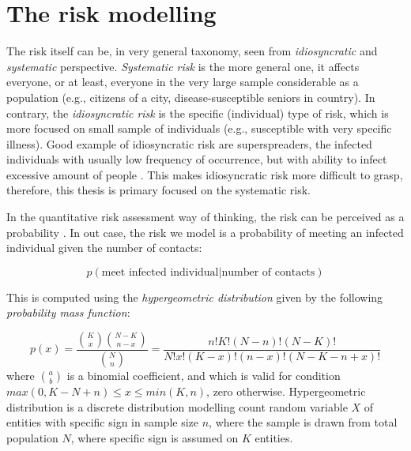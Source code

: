 \documentclass[
  digital, %
  table,   %
  twoside, %
  12pt,
  lof,     %
  lot,     %
]{fithesis3}
\begin{document}
\section{The risk modelling}

The risk itself can be, in very general taxonomy, seen from
\textit{idiosyncratic} and \textit{systematic} perspective.
\textit{Systematic risk} is the more general one, it affects everyone, 
or at least, everyone in the very large sample considerable as a population
(e.g., citizens of a city, disease-susceptible seniors in country).
In contrary, the \textit{idiosyncratic risk} is the specific (individual) type of risk,
which is more focused on small sample of individuals (e.g., susceptible with very specific illness).
Good example of idiosyncratic risk are superspreaders, the infected
individuals with usually low frequency of occurrence, but with ability to
infect excessive amount of people \cite[Chapter~4]{brauer2008}.
This makes idiosyncratic risk more difficult to grasp, therefore, this thesis 
is primary focused on the systematic risk.

In the quantitative risk assessment way of thinking, the risk can be
perceived as a probability \cite[Chapter~14]{bahr2014}.
In out case, the risk we model is a probability of meeting an
infected individual given the number of contacts:

\begin{equation}
  p(\text{meet infected individual} | \text{number of contacts})
\end{equation}

This is computed using the \textit{hypergeometric distribution} 
given by  the following \textit{probability mass function}:

\begin{equation}
p \left( x \right) = 
\frac{
    \binom{K}{x}
    \binom{N-K}{n-x}
  }{
    \binom{N}{n}
  } =
  \frac{
    n!K! \left( N - n \right)!\left( N - K \right )!
  }{
    N! x! \left(K - x\right)! \left( n - x \right)! \left( N - K - n + x \right)!
  }
\end{equation}
where $\binom{a}{b}$ is a binomial coefficient, and which is valid for condition $max\left( 0, K - N + n \right) \leq x \leq min\left( K, n \right)$, zero otherwise. Hypergeometric distribution is a discrete distribution modelling count random variable $X$ of entities with specific sign in sample size $n$, where the sample is drawn from total population $N$, where specific sign is assumed on $K$ entities.
\end{document}
